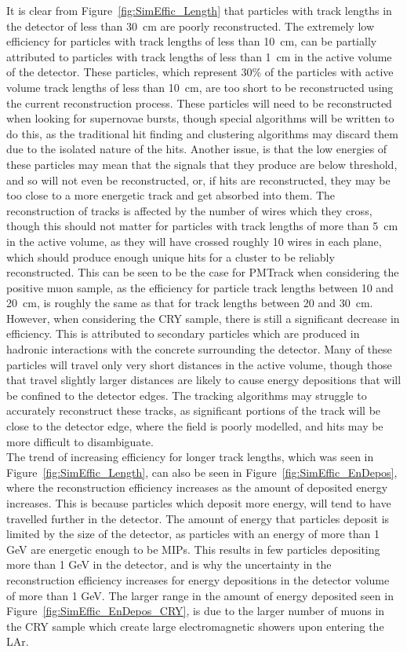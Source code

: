 It is clear from Figure~\ref{fig:SimEffic_Length} that particles with track lengths in the detector of less than 30~cm are poorly reconstructed. The extremely low efficiency for particles with track lengths of less than 10~cm, can be partially attributed to particles with track lengths of less than 1~cm in the active volume of the detector. These particles, which represent 30\% of the particles with active volume track lengths of less than 10~cm, are too short to be reconstructed using the current reconstruction process. These particles will need to be reconstructed when looking for supernovae bursts, though special algorithms will be written to do this, as the traditional hit finding and clustering algorithms may discard them due to the isolated nature of the hits. Another issue, is that the low energies of these particles may mean that the signals that they produce are below threshold, and so will not even be reconstructed, or, if hits are reconstructed, they may be too close to a more energetic track and get absorbed into them. The reconstruction of tracks is affected by the number of wires which they cross, though this should not matter for particles with track lengths of more than 5~cm in the active volume, as they will have crossed roughly 10 wires in each plane, which should produce enough unique hits for a cluster to be reliably reconstructed. This can be seen to be the case for PMTrack when considering the positive muon sample, as the efficiency for particle track lengths between 10 and 20~cm, is roughly the same as that for track lengths between 20 and 30~cm. However, when considering the CRY sample, there is still a significant decrease in efficiency. This is attributed to secondary particles which are produced in hadronic interactions with the concrete surrounding the detector. Many of these particles will travel only very short distances in the active volume, though those that travel slightly larger distances are likely to cause energy depositions that will be confined to the detector edges. The tracking algorithms may struggle to accurately reconstruct these tracks, as significant portions of the track will be close to the detector edge, where the field is poorly modelled, and hits may be more difficult to disambiguate. \\

The trend of increasing efficiency for longer track lengths, which was seen in Figure~\ref{fig:SimEffic_Length}, can also be seen in Figure~\ref{fig:SimEffic_EnDepos}, where the reconstruction efficiency increases as the amount of deposited energy increases. This is because particles which deposit more energy, will tend to have travelled further in the detector. The amount of energy that particles deposit is limited by the size of the detector, as particles with an energy of more than 1 GeV are energetic enough to be MIPs. This results in few particles depositing more than 1 GeV in the detector, and is why the uncertainty in the reconstruction efficiency increases for energy depositions in the detector volume of more than 1 GeV. The larger range in the amount of energy deposited seen in Figure~\ref{fig:SimEffic_EnDepos_CRY}, is due to the larger number of muons in the CRY sample which create large electromagnetic showers upon entering the LAr. \\

